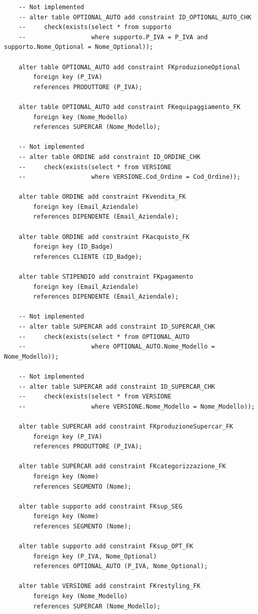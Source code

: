 \documentclass[11pt]{article}
\begin{document}
\begin{lstlisting}
    -- Not implemented
    -- alter table OPTIONAL_AUTO add constraint ID_OPTIONAL_AUTO_CHK
    --     check(exists(select * from supporto
    --                  where supporto.P_IVA = P_IVA and supporto.Nome_Optional = Nome_Optional)); 

    alter table OPTIONAL_AUTO add constraint FKproduzioneOptional
        foreign key (P_IVA)
        references PRODUTTORE (P_IVA);

    alter table OPTIONAL_AUTO add constraint FKequipaggiamento_FK
        foreign key (Nome_Modello)
        references SUPERCAR (Nome_Modello);

    -- Not implemented
    -- alter table ORDINE add constraint ID_ORDINE_CHK
    --     check(exists(select * from VERSIONE
    --                  where VERSIONE.Cod_Ordine = Cod_Ordine)); 

    alter table ORDINE add constraint FKvendita_FK
        foreign key (Email_Aziendale)
        references DIPENDENTE (Email_Aziendale);

    alter table ORDINE add constraint FKacquisto_FK
        foreign key (ID_Badge)
        references CLIENTE (ID_Badge);

    alter table STIPENDIO add constraint FKpagamento
        foreign key (Email_Aziendale)
        references DIPENDENTE (Email_Aziendale);

    -- Not implemented
    -- alter table SUPERCAR add constraint ID_SUPERCAR_CHK
    --     check(exists(select * from OPTIONAL_AUTO
    --                  where OPTIONAL_AUTO.Nome_Modello = Nome_Modello)); 

    -- Not implemented
    -- alter table SUPERCAR add constraint ID_SUPERCAR_CHK
    --     check(exists(select * from VERSIONE
    --                  where VERSIONE.Nome_Modello = Nome_Modello)); 

    alter table SUPERCAR add constraint FKproduzioneSupercar_FK
        foreign key (P_IVA)
        references PRODUTTORE (P_IVA);

    alter table SUPERCAR add constraint FKcategorizzazione_FK
        foreign key (Nome)
        references SEGMENTO (Nome);

    alter table supporto add constraint FKsup_SEG
        foreign key (Nome)
        references SEGMENTO (Nome);

    alter table supporto add constraint FKsup_OPT_FK
        foreign key (P_IVA, Nome_Optional)
        references OPTIONAL_AUTO (P_IVA, Nome_Optional);

    alter table VERSIONE add constraint FKrestyling_FK
        foreign key (Nome_Modello)
        references SUPERCAR (Nome_Modello);


\end{lstlisting}
\end{document}
